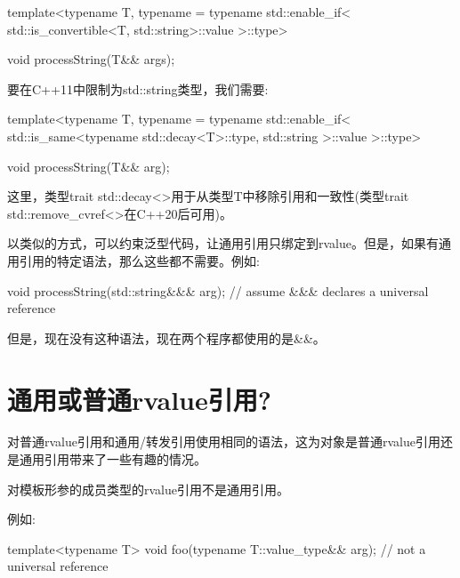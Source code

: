 \begin{codebox}[cpp]
template<typename T,
typename = typename std::enable_if<
std::is_convertible<T, std::string>::value
>::type>

void processString(T&& args);
\end{codebox}

要在C++11中限制为std::string类型，我们需要:\par

\begin{codebox}[cpp]
template<typename T,
typename = typename std::enable_if<
std::is_same<typename std::decay<T>::type,
        std::string
      >::value
    >::type>

void processString(T&& arg);
\end{codebox}

这里，类型trait std::\allowbreak{}decay<\allowbreak{}>用于从类型T中移除引用和一致性(类型trait std::remove\_cvref<>在C++20后可用)。\par

以类似的方式，可以约束泛型代码，让通用引用只绑定到rvalue。但是，如果有通用引用的特定语法，那么这些都不需要。例如:\par

\begin{codebox}[cpp]
void processString(std::string&&& arg); // assume &&& declares a universal reference
\end{codebox}

但是，现在没有这种语法，现在两个程序都使用的是\&\&。\par


\section{通用或普通rvalue引用?}

对普通rvalue引用和通用/转发引用使用相同的语法，这为对象是普通rvalue引用还是通用引用带来了一些有趣的情况。\par


对模板形参的成员类型的rvalue引用不是通用引用。\par

例如:\par

\begin{codebox}[cpp]
template<typename T>
void foo(typename T::value_type&& arg); // not a universal reference
\end{codebox}

